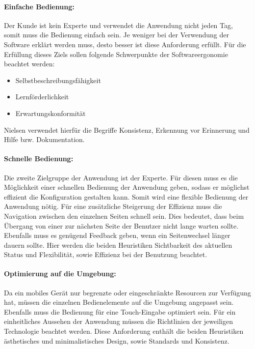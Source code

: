 \paragraph{Einfache Bedienung:} Der Kunde ist kein Experte und verwendet die Anwendung nicht jeden Tag, somit muss die Bedienung einfach sein. Je weniger bei der Verwendung der Software erklärt werden muss, desto besser ist diese Anforderung erfüllt. Für die Erfüllung dieses Ziels sollen folgende Schwerpunkte der Softwareergonomie \cite{bib:softwareErgonomie} beachtet werden: 
\begin{itemize}
        \item Selbstbeschreibungsfähigkeit
        \item Lernförderlichkeit
        \item Erwartungskonformität
\end{itemize}
Nielsen verwendet hierfür die Begriffe Konsistenz, Erkennung vor Erinnerung und Hilfe bzw. Dokumentation.

\paragraph{Schnelle Bedienung:} Die zweite Zielgruppe der Anwendung ist der Experte. Für diesen muss es die Möglichkeit einer schnellen Bedienung der Anwendung geben, sodass er möglichst effizient die Konfiguration gestalten kann. Somit wird eine flexible Bedienung der Anwendung nötig. Für eine zusätzliche Steigerung der Effizienz muss die Navigation zwischen den einzelnen Seiten schnell sein. Dies bedeutet, dass beim Übergang von einer zur nächsten Seite der Benutzer nicht lange warten sollte. Ebenfalls muss es genügend Feedback geben, wenn ein Seitenwechsel länger dauern sollte. Hier werden die beiden Heuristiken Sichtbarkeit des aktuellen Status und Flexibilität, sowie Effizienz bei der Benutzung beachtet.

\paragraph{Optimierung auf die Umgebung: } Da ein mobiles Gerät nur begrenzte oder eingeschränkte Resourcen zur Verfügung hat, müssen die einzelnen Bedienelemente auf die Umgebung angepasst sein. Ebenfalls muss die Bedienung für eine Touch-Eingabe optimiert sein. 
Für ein einheitliches Aussehen der Anwendung müssen die Richtlinien der jeweiligen Technologie beachtet werden. Diese Anforderung enthält die beiden Heuristiken ästhetisches und minimalistisches Design, sowie Standards und Konsistenz.

